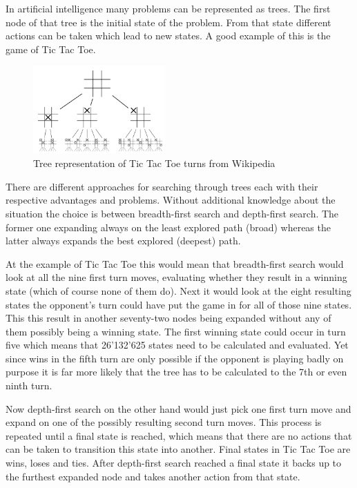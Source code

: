 In artificial intelligence many problems can be represented as trees. The first node of that tree is the initial state of the problem. From that state different actions can be taken which lead to new states. A good example of this is the game of Tic Tac Toe.

\begin{figure}[H]
  \includegraphics[width=0.45\textwidth]{images/tree_search_tic_tac_toe.png}
  \caption[\url{http://en.wikipedia.org/wiki/Tic-tac-toe}]{Tree representation of Tic Tac Toe turns from Wikipedia}
\end{figure}

There are different approaches for searching through trees each with their respective advantages and problems. Without additional knowledge about the situation the choice is between breadth-first search and depth-first search. The former one expanding always on the least explored path (broad) whereas the latter always expands the best explored (deepest) path. 

At the example of Tic Tac Toe this would mean that breadth-first search would look at all the nine first turn moves, evaluating whether they result in a winning state (which of course none of them do). Next it would look at the eight resulting states the opponent's turn could have put the game in for all of those nine states. This this result in another seventy-two nodes being expanded without any of them possibly being a winning state. The first winning state could occur in turn five which means that 26'132'625 states need to be calculated and evaluated. Yet since wins in the fifth turn are only possible if the opponent is playing badly on purpose it is far more likely that the tree has to be calculated to the 7th or even ninth turn.

Now depth-first search on the other hand would just pick one first turn move and expand on one of the possibly resulting second turn moves. This process is repeated until a final state is reached, which means that there are no actions that can be taken to transition this state into another. Final states in Tic Tac Toe are wins, loses and ties. After depth-first search reached a final state it backs up to the furthest expanded node and takes another action from that state.

